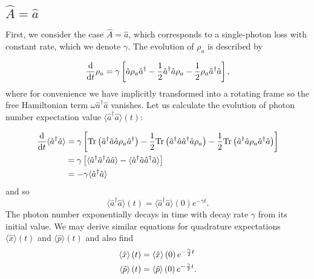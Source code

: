 \subsection{$\hat{A} = \hat{a}$}\label{sec:A_a}
First, we consider the case $\hat{A}=\hat{a}$, which corresponds to a single-photon loss with constant rate, which we denote $\gamma$. The evolution of $\rho_a$ is described by

\begin{equation}\label{eqn:phog_lindblad_single_photon_loss}
\frac{\mathrm{d}}{\mathrm{d}t} \rho_a = \gamma\left[\hat{a}\rho_a \hat{a}^\dagger - \frac{1}{2} \hat{a}^\dagger \hat{a} \rho_a - \frac{1}{2} \rho_a \hat{a}^\dagger \hat{a}\right],
\end{equation}
where for convenience we have implicitly transformed into a rotating frame so the free Hamiltonian term $\omega \hat{a}^\dagger \hat{a}$ vanishes. Let us calculate the evolution of photon number expectation value $\langle \hat{a}^\dagger \hat{a}\rangle\left(t\right)$:

\begin{align}
\ddt \langle \hat{a}^\dagger \hat{a}\rangle &= \gamma \left[ \text{Tr}\left(\hat{a}^\dagger \hat{a} \hat{a} \rho_a \hat{a}^\dagger \right) - \frac{1}{2} \text{Tr}\left(\hat{a}^\dagger \hat{a} \hat{a}^\dagger \hat{a} \rho_a\right) - \frac{1}{2} \text{Tr}\left(\hat{a}^\dagger \hat{a} \rho_a \hat{a}^\dagger \hat{a}\right)\right] \notag \\
%
&= \gamma \left[ \langle \hat{a}^\dagger \hat{a}^\dagger \hat{a}\hat{a}\rangle - \langle \hat{a}^\dagger \hat{a} \hat{a}^\dagger \hat{a}\rangle \right] \notag \\
%
&= - \gamma \langle \hat{a}^\dagger \hat{a}\rangle
\end{align}
\noindent and so
\begin{equation}\label{eqn:phog_single_photon_loss_number_expectation}
\langle\hat{a}^\dagger \hat{a} \rangle \left(t\right) = \langle \hat{a}^\dagger \hat{a}\rangle \left(0\right) e^{- \gamma t}.
\end{equation}
The photon number exponentially decays in time with decay rate $\gamma$ from its initial value. We may derive similar equations for quadrature expectations $\langle\hat{x}\rangle\left(t\right)$ and $\langle\hat{p}\rangle\left(t\right)$ and also find 
\begin{align}\label{eqn:phog_single_photon_loss_quadrature_expectation}
 \langle \hat{x}\rangle\left(t\right) &= \langle \hat{x}\rangle\left(0\right) e^{- \frac{\gamma}{2} t} \notag \\
%
 \langle \hat{p}\rangle\left(t\right) &= \langle \hat{p}\rangle \left(0\right) e^{- \frac{\gamma}{2} t}.
\end{align}

